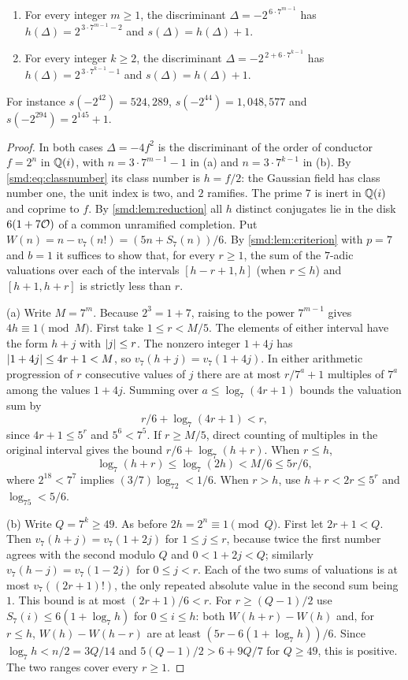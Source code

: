 \begin{theorem}\label{smd:thm:dyadic}
\leavevmode
\begin{enumerate}[label=\textup{(\alph*)}]
\item For every integer $m\ge1$, the discriminant $\Delta=-2^{\,6\cdot7^{m-1}}$ has
$h(\Delta)=2^{\,3\cdot7^{m-1}-2}$ and $s(\Delta)=h(\Delta)+1$.
\item For every integer $k\ge2$, the discriminant $\Delta=-2^{\,2+6\cdot7^{k-1}}$ has
$h(\Delta)=2^{\,3\cdot7^{k-1}-1}$ and $s(\Delta)=h(\Delta)+1$.
\end{enumerate}
For instance $s(-2^{42})=524{,}289$, $s(-2^{44})=1{,}048{,}577$ and
$s(-2^{294})=2^{145}+1$.
\end{theorem}

\begin{proof}
In both cases $\Delta=-4f^2$ is the discriminant of the order of conductor $f=2^n$ in
$\mathbb{Q}(i)$, with $n=3\cdot7^{m-1}-1$ in (a) and $n=3\cdot7^{k-1}$ in (b). By
\eqref{smd:eq:classnumber} its class number is $h=f/2$: the Gaussian field has class
number one, the unit index is two, and $2$ ramifies. The prime $7$ is inert in $\mathbb{Q}(i)$
and coprime to $f$. By \cref{smd:lem:reduction} all $h$ distinct conjugates lie in the
disk $6(1+7\mathcal{O})$ of a common unramified completion. Put
$W(n)=n-v_7(n!)=(5n+S_7(n))/6$. By \cref{smd:lem:criterion} with $p=7$ and $b=1$ it
suffices to show that, for every $r\ge1$, the sum of the $7$-adic valuations over each of
the intervals $[h-r+1,h]$ (when $r\le h$) and $[h+1,h+r]$ is strictly less than $r$.

(a) Write $M=7^m$. Because $2^3=1+7$, raising to the power $7^{m-1}$ gives
$4h\equiv1\pmod M$. First take $1\le r<M/5$. The elements of either interval have the
form $h+j$ with $\lvert j\rvert\le r$. The nonzero integer $1+4j$ has $\lvert1+4j\rvert\le4r+1<M$, so
$v_7(h+j)=v_7(1+4j)$. In either arithmetic progression of $r$ consecutive values of $j$
there are at most $r/7^a+1$ multiples of $7^a$ among the values $1+4j$. Summing over
$a\le\log_7(4r+1)$ bounds the valuation sum by
\[
 r/6+\log_7(4r+1)<r ,
\]
since $4r+1\le5^r$ and $5^6<7^5$. If $r\ge M/5$, direct counting of multiples in the
original interval gives the bound $r/6+\log_7(h+r)$. When $r\le h$,
\[
 \log_7(h+r)\le\log_7(2h)<M/6\le5r/6 ,
\]
where $2^{18}<7^7$ implies $(3/7)\log_72<1/6$. When $r>h$, use $h+r<2r\le5^r$ and
$\log_75<5/6$.

(b) Write $Q=7^k\ge49$. As before $2h=2^n\equiv1\pmod Q$. First let $2r+1<Q$. Then
$v_7(h+j)=v_7(1+2j)$ for $1\le j\le r$, because twice the first number agrees with the
second modulo $Q$ and $0<1+2j<Q$; similarly $v_7(h-j)=v_7(1-2j)$ for $0\le j<r$. Each of
the two sums of valuations is at most $v_7((2r+1)!)$, the only repeated absolute value in
the second sum being $1$. This bound is at most $(2r+1)/6<r$. For $r\ge(Q-1)/2$ use
$S_7(i)\le6(1+\log_7h)$ for $0\le i\le h$: both $W(h+r)-W(h)$ and, for $r\le h$,
$W(h)-W(h-r)$ are at least $(5r-6(1+\log_7h))/6$. Since $\log_7h<n/2=3Q/14$ and
$5(Q-1)/2>6+9Q/7$ for $Q\ge49$, this is positive. The two ranges cover every $r\ge1$.
\end{proof}

